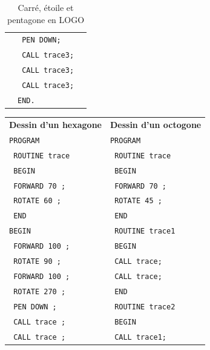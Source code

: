 \begin{table}[t]
\begin{tabular}{l|l|l}
                                &  \texttt{  PEN DOWN;}          & \\
                                &  \texttt{  CALL trace3;}       & \\ 
                                &  \texttt{  CALL trace3;}       & \\ 
                                &  \texttt{  CALL trace3;}       & \\ 
                                &  \texttt{END.}                 & \\ 
  \end{tabular}
  \caption{Carré, étoile et pentagone en LOGO}
  \ligne
\end{table}



\begin{table}[t]
  \centering
  \small
  \begin{tabular}{l|l}
  \textbf{Dessin d'un hexagone} &  \textbf{Dessin d'un octogone} \\
  \texttt{PROGRAM}              &  \texttt{PROGRAM}              \\
  \texttt{  ROUTINE trace}      &  \texttt{  ROUTINE trace}      \\
  \texttt{  BEGIN}              &  \texttt{  BEGIN}              \\
  \texttt{    FORWARD 70 ;}     &  \texttt{    FORWARD 70 ;}     \\
  \texttt{    ROTATE 60 ;}      &  \texttt{    ROTATE 45 ;}      \\
  \texttt{  END}                &  \texttt{  END}                \\
  \texttt{BEGIN}                &  \texttt{  ROUTINE trace1}     \\
  \texttt{  FORWARD 100 ;}      &  \texttt{  BEGIN}              \\
  \texttt{  ROTATE 90 ;}        &  \texttt{    CALL trace;}      \\
  \texttt{  FORWARD 100 ;}      &  \texttt{    CALL trace;}      \\
  \texttt{  ROTATE 270 ;}       &  \texttt{  END}                \\
  \texttt{  PEN DOWN ;}         &  \texttt{  ROUTINE trace2}     \\
  \texttt{  CALL trace ;}       &  \texttt{  BEGIN}              \\
  \texttt{  CALL trace ;}       &  \texttt{    CALL trace1;}     \\

\end{tabular}
\end{table}

